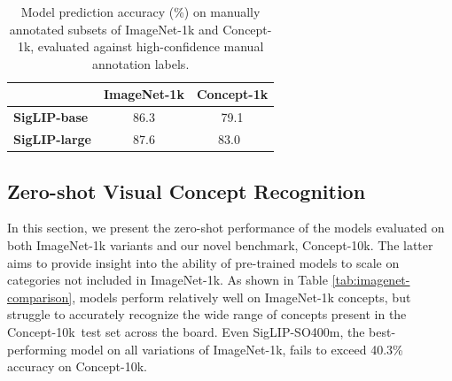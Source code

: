 \documentclass[11pt]{article}
\newcommand{\benchmark}{Concept-10k}
\begin{document}
\begin{table}[t!]
\raggedright
\begin{tabular}{l c c}
\toprule
\textbf{}        & \textbf{ImageNet-1k}   & \textbf{Concept-1k} \\ 
\midrule
\textbf{SigLIP-base}    & 86.3              & 79.1        \\ 
\textbf{SigLIP-large}    & 87.6               & 83.0\       \\ 
\bottomrule
\end{tabular}
\caption{Model prediction accuracy (\%) on manually annotated subsets of ImageNet-1k and Concept-1k, evaluated against high-confidence manual annotation labels.}
\label{tab:conc_vs_in-model}
\end{table}

\subsection{Zero-shot Visual Concept Recognition}
In this section, we present the zero-shot performance of the models evaluated on both ImageNet-1k variants and our novel benchmark, \benchmark. 
The latter aims to provide insight into the ability of pre-trained models to scale on categories not included in ImageNet-1k.
As shown in Table \ref{tab:imagenet-comparison}, models perform relatively well on ImageNet-1k concepts, but struggle to accurately recognize the wide range of concepts present in the \benchmark~test set across the board. 
Even SigLIP-SO400m, the best-performing model on all variations of ImageNet-1k, fails to exceed 40.3\% accuracy on \benchmark. 

\end{document}
